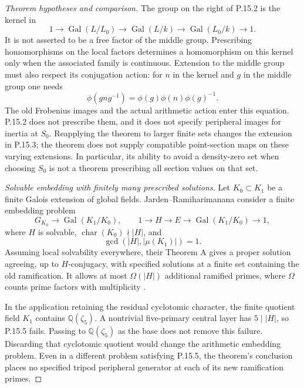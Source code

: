 \begin{proof}[Theorem hypotheses and comparison]
The group on the right of P.15.2 is the kernel in
\[
 1\longrightarrow\operatorname{Gal}(L/L_0)
 \longrightarrow\operatorname{Gal}(L/k)
 \longrightarrow\operatorname{Gal}(L_0/k)\longrightarrow1.
                                                               \tag{P.15.3}
\]
It is not asserted to be a free factor of the middle group.
Prescribing homomorphisms on the local factors determines a
homomorphism on this kernel only when the associated family is
continuous. Extension to the middle group must also respect
its conjugation action: for $n$ in the kernel and $g$ in the
middle group one needs
\[
                  \phi(gng^{-1})=\phi(g)\phi(n)\phi(g)^{-1}.
                                                               \tag{P.15.4}
\]
The old Frobenius images and the actual arithmetic action enter
this equation. P.15.2 does not prescribe them, and it does not
specify peripheral images for inertia at $S_0$. Reapplying the
theorem to larger finite sets changes the extension in P.15.3;
the theorem does not supply compatible point-section maps on
these varying extensions. In particular, its ability to avoid a
density-zero set when choosing $S_0$ is not a theorem prescribing
all section values on that set.

\emph{Solvable embedding with finitely many prescribed solutions.}
Let $K_0\subset K_1$ be a finite Galois extension of global
fields. Jarden--Ramiharimanana consider a finite embedding problem
\[
 G_{K_0}\longrightarrow\operatorname{Gal}(K_1/K_0),\qquad
 1\longrightarrow H\longrightarrow E
 \longrightarrow\operatorname{Gal}(K_1/K_0)\longrightarrow1,
\]
where $H$ is solvable,
$\operatorname{char}(K_0)\nmid |H|$, and
\[
                     \gcd(|H|,|\mu(K_1)|)=1.                  \tag{P.15.5}
\]
Assuming local solvability everywhere, their Theorem A gives a
proper solution agreeing, up to $H$-conjugacy, with specified
solutions at a finite set containing the old ramification. It
allows at most $\Omega(|H|)$ additional ramified primes, where
$\Omega$ counts prime factors with multiplicity
\citep[Theorem A, author pp.~3--4]{LitJardenRamiharimanana2018}.

In the application retaining the residual cyclotomic character,
the finite quotient field $K_1$ contains $\mathbb Q(\zeta_5)$.
A nontrivial five-primary central layer has $5\mid |H|$, so
P.15.5 fails. Passing to $\mathbb Q(\zeta_5)$ as the base does
not remove this failure. Discarding that cyclotomic quotient
would change the arithmetic embedding problem. Even in a
different problem satisfying P.15.5, the theorem's conclusion
places no specified tripod peripheral generator at each of its
new ramification primes.


\end{proof}

